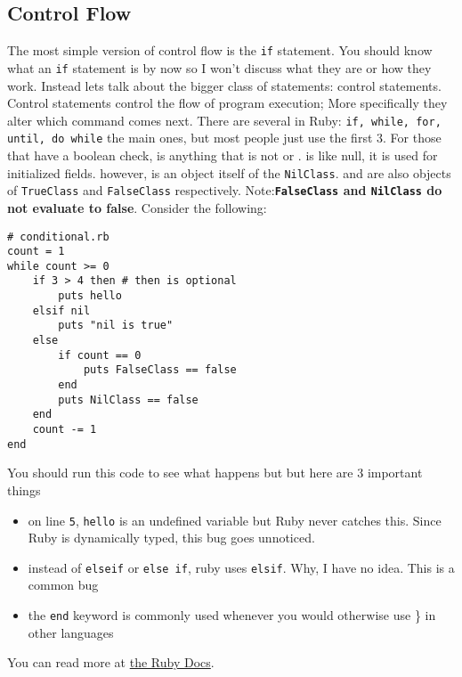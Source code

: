 \documentclass[main.tex]{subfiles}
\begin{document}
\subsection{Control Flow}
The most simple version of control flow is the \texttt{if} statement. You should know what an \texttt{if} statement is by now so I won't discuss what they are or how they work.
Instead lets talk about the bigger class of statements: control statements. Control statements control the flow of program execution;
More specifically they alter which command comes next.
There are several in Ruby: \texttt{if, while, for, until, do while} the main ones, but most people just use the first 3. 
For those that have a boolean check,  is anything that is not  or . 
 is like null, it is used for initialized fields. however,  is an object itself of the \texttt{NilClass}.
 and  are also objects of \texttt{TrueClass} and \texttt{FalseClass} respectively. 
Note:\textbf{\texttt{FalseClass} and \texttt{NilClass} do not evaluate to false}. Consider the following:
\begin{lstlisting}[style=MyRubyStyle]
# conditional.rb
count = 1
while count >= 0
    if 3 > 4 then # then is optional
        puts hello
    elsif nil
        puts "nil is true"
    else
        if count == 0
            puts FalseClass == false
        end
        puts NilClass == false
    end
    count -= 1
end
\end{lstlisting}
You should run this code to see what happens but but here are 3 important things
\begin{itemize}
    \item on line \texttt{5}, \texttt{hello} is an undefined variable but Ruby never catches this.
    Since Ruby is dynamically typed, this bug goes unnoticed.
    \item instead of \texttt{elseif} or \texttt{else if}, ruby uses \texttt{elsif}. Why, I have no idea. This is a common bug
    \item the \texttt{end} keyword is commonly used whenever you would otherwise use \} in other languages
\end{itemize}
You can read more at \href{https://docs.ruby-lang.org/en/3.0/syntax/control_expressions_rdoc.html}{the Ruby Docs}.
\end{document}
